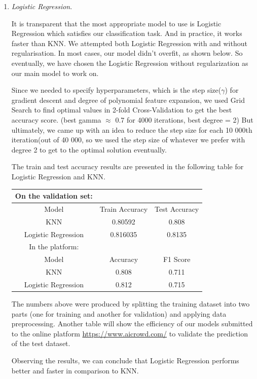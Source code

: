 \documentclass[10pt,conference,compsocconf]{IEEEtran}
\begin{document}
\begin{enumerate}
\item {\textit{Logistic Regression}.}

It is transparent that the most appropriate model to use is Logistic Regression which satisfies our classification task. And in practice, it works faster than KNN. 
We attempted both Logistic Regression with and without regularisation. In most cases, our model didn't overfit, as shown below. So eventually, we have chosen the Logistic Regression without regularization as our main model to work on.

Since we needed to specify hyperparameters, which is the step size($\gamma$) for gradient descent and degree of polynomial feature expansion, we used Grid Search to find optimal values in 2-fold Cross-Validation to get the best accuracy score. (best gamma $\approx$ 0.7 for 4000 iterations, best degree = 2)
But ultimately, we came up with an idea to reduce the step size for each 10 000th iteration(out of 40 000, so we used the step size of whatever we prefer with degree 2 to get to the optimal solution eventually.

The train and test accuracy results are presented in the following table for Logistic Regression and KNN.

\begin{center}
\begin{tabular}{||c c c||} 
 \hline On the validation set: \\ \hline\hline
 Model & Train Accuracy & Test Accuracy \\ [0.5ex] 
 \hline\hline
 KNN & 0.80592 & 0.808 \\ 
  Logistic Regression & 0.816035 & 0.8135 \\ 
  \hline
 \hline In the platform: \\ \hline\hline
  Model & Accuracy & F1 Score \\ [0.5ex] 
  \hline\hline
  KNN & 0.808 & 0.711 \\ 
  Logistic Regression & 0.812 & 0.715 \\ 
  \hline
 \end{tabular}
\end{center}
\hfill \break
The numbers above were produced by splitting the training dataset into two parts (one for training and another for validation) and applying data preprocessing.
Another table will show the efficiency of our models submitted to the online platform \href{AICrowd}{https://www.aicrowd.com/} to validate the prediction of the test dataset.

Observing the results, we can conclude that Logistic Regression performs better and faster in comparison to KNN.
\end{enumerate}
\end{document}
